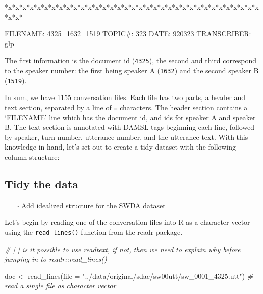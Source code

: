 \documentclass[
  letterpaper,
  DIV=11,
  numbers=noendperiod]{scrreport}
\newenvironment{Shaded}{\begin{snugshade}}{\end{snugshade}}
\newcommand{\AttributeTok}[1]{\textcolor[rgb]{0.00,0.00,0.00}{#1}}
\newcommand{\CommentTok}[1]{\textcolor[rgb]{0.00,0.00,0.00}{\textit{#1}}}
\newcommand{\FunctionTok}[1]{\textcolor[rgb]{0.00,0.00,0.00}{#1}}
\newcommand{\NormalTok}[1]{\textcolor[rgb]{0.00,0.00,0.00}{#1}}
\newcommand{\OtherTok}[1]{\textcolor[rgb]{0.00,0.00,0.00}{#1}}
\newcommand{\StringTok}[1]{\textcolor[rgb]{0.00,0.00,0.00}{#1}}
\providecommand{\tightlist}{%
  \setlength{\itemsep}{0pt}\setlength{\parskip}{0pt}}\usepackage{longtable,booktabs,array}
\theoremstyle{definition}
\theoremstyle{remark}
\begin{document}
\begin{Shaded}
\begin{Highlighting}[]
\NormalTok{*x*x*x*x*x*x*x*x*x*x*x*x*x*x*x*x*x*x*x*x*x*x*x*x*x*x*x*x*x*x*x*x*x*x*x*x*x*}


\NormalTok{FILENAME:   4325\_1632\_1519}
\NormalTok{TOPIC\#:     323}
\NormalTok{DATE:       920323}
\NormalTok{TRANSCRIBER:    glp}
\end{Highlighting}
\end{Shaded}

The first information is the document id (\texttt{4325}), the second and
third correspond to the speaker number: the first being speaker A
(\texttt{1632}) and the second speaker B (\texttt{1519}).

In sum, we have 1155 conversation files. Each file has two parts, a
header and text section, separated by a line of \texttt{=} characters.
The header section contains a `FILENAME' line which has the document id,
and ids for speaker A and speaker B. The text section is annotated with
DAMSL tags beginning each line, followed by speaker, turn number,
utterance number, and the utterance text. With this knowledge in hand,
let's set out to create a tidy dataset with the following column
structure:

\begin{table}

\end{table}

\hypertarget{tidy-the-data-1}{%
\subsection{Tidy the data}\label{tidy-the-data-1}}

\begin{itemize}
\tightlist
\item[$\square$]
  Add idealized structure for the SWDA dataset
\end{itemize}

Let's begin by reading one of the conversation files into R as a
character vector using the \texttt{read\_lines()} function from the
readr package.

\begin{Shaded}
\begin{Highlighting}[]
\CommentTok{\# [ ] is it possible to use readtext, if not, then we need to explain why before jumping in to readr::read\_lines()}

\NormalTok{doc }\OtherTok{\textless{}{-}}
  \FunctionTok{read\_lines}\NormalTok{(}\AttributeTok{file =} \StringTok{"../data/original/sdac/sw00utt/sw\_0001\_4325.utt"}\NormalTok{) }\CommentTok{\# read a single file as character vector}
\end{Highlighting}
\end{Shaded}
\end{document}
